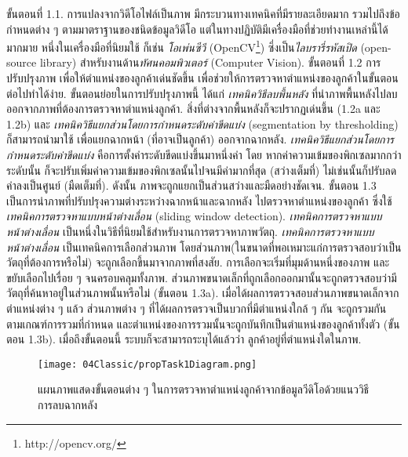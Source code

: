 ขั้นตอนที่ 1.1. การแปลงจากวิดีโอไฟล์เป็นภาพ มีกระบวนทางเทคนิคที่มีรายละเอียดมาก
รวมไปถึงข้อกำหนดต่าง ๆ ตามมาตราฐานของชนิดข้อมูลวิดีโอ 
แต่ในทางปฏิบัติมีเครื่องมือที่ช่วยทำงานเหล่านี้ได้มากมาย 
หนึ่งในเครื่องมือที่นิยมใช้ ก็เช่น \textit{โอเพ่นซีวี} (OpenCV\footnote{%
http://opencv.org/})  ซึ่งเป็น\textit{ไลบรารี่รหัสเปิด} (open-source library) สำหรับงานด้าน\textit{ทัศนคอมพิวเตอร์} (Computer Vision).
ขั้นตอนที่ 1.2 การปรับปรุงภาพ เพื่อให้ตำแหน่งของลูกค้าเด่นชัดขึ้น 
เพื่อช่วยให้การตรวจหาตำแหน่งของลูกค้าในขั้นตอนต่อไปทำได้ง่าย. 
ขั้นตอนย่อยในการปรับปรุงภาพนี้ ได้แก่ 
\textit{เทคนิควิธีลบพื้นหลัง} ที่นำภาพพื้นหลังไปลบออกจากภาพที่ต้องการตรวจหาตำแหน่งลูกค้า. 
สิ่งที่ต่างจากพื้นหลังก็จะปรากฏเด่นขึ้น (1.2a และ 1.2b)
และ \textit{เทคนิควิธีแยกส่วนโดยการกำหนดระดับค่าขีดแบ่ง} (segmentation by thresholding) ก็สามารถนำมาใช้
เพื่อแยกฉากหน้า (ที่อาจเป็นลูกค้า) ออกจากฉากหลัง. 
\textit{เทคนิควิธีแยกส่วนโดยการกำหนดระดับค่าขีดแบ่ง} 
คือการตั้งค่าระดับขีดแบ่งขึ้นมาหนึ่งค่า 
โดย หากค่าความเข้มของพิกเซลมากกว่าระดับนั้น 
ก็จะปรับเพิ่มค่าความเข้มของพิกเซลนั้นไปจนมีค่ามากที่สุด (สว่างเต็มที่) 
ไม่เช่นนั้นก็ปรับลดค่าลงเป็นศูนย์ (มืดเต็มที่). 
ดังนั้น ภาพจะถูกแยกเป็นส่วนสว่างและมืดอย่างชัดเจน.  
ขั้นตอน 1.3 เป็นการนำภาพที่ปรับปรุงความต่างระหว่างฉากหน้าและฉากหลัง ไปตรวจหาตำแหน่งของลูกค้า 
ซึ่งใช้\textit{เทคนิคการตรวจหาแบบหน้าต่างเลื่อน} (sliding window detection). 
\textit{เทคนิคการตรวจหาแบบหน้าต่างเลื่อน} เป็นหนึ่งในวิธีที่นิยมใช้สำหรับงานการตรวจหาภาพวัตถุ. 
\textit{เทคนิคการตรวจหาแบบหน้าต่างเลื่อน} 
เป็นเทคนิคการเลือกส่วนภาพ 
โดยส่วนภาพ(ในขนาดที่พอเหมาะแก่การตรวจสอบว่าเป็นวัตถุที่ต้องการหรือไม่) 
จะถูกเลือกขึ้นมาจากภาพที่สงสัย.
การเลือกจะเริ่มที่มุมด้านหนึ่งของภาพ และขยับเลือกไปเรื่อย ๆ จนครอบคลุมทั้งภาพ.
%
ส่วนภาพขนาดเล็กที่ถูกเลือกออกมานั้นจะถูกตรวจสอบว่ามีวัตถุที่ค้นหาอยู่ในส่วนภาพนั้นหรือไม่
(ขั้นตอน 1.3a). 
เมื่อได้ผลการตรวจสอบส่วนภาพขนาดเล็กจากตำแหน่งต่าง ๆ แล้ว 
ส่วนภาพต่าง ๆ ที่ได้ผลการตรวจเป็นบวกที่มีตำแหน่งใกล้ ๆ กัน จะถูกรวมกันตามเกณฑ์การรวมที่กำหนด 
และตำแหน่งของการรวมนั้นจะถูกบันทึกเป็นตำแหน่งของลูกค้าทั้งตัว (ขั้นตอน 1.3b).
เมื่อถึงขั้นตอนนี้ 
ระบบก็จะสามารถระบุได้แล้วว่า ลูกค้าอยู่ที่ตำแหน่งใดในภาพ. 

\begin{figure}
\centering
\texttt{[image: 04Classic/propTask1Diagram.png]}
\caption[วิธีการลบฉากหลัง]{แผนภาพแสดงขั้นตอนต่าง ๆ ในการตรวจหาตำแหน่งลูกค้าจากข้อมูลวีดิโอด้วยแนววิธีการลบฉากหลัง}
\label{fig: Background Subtraction Pipeline}
\end{figure}


